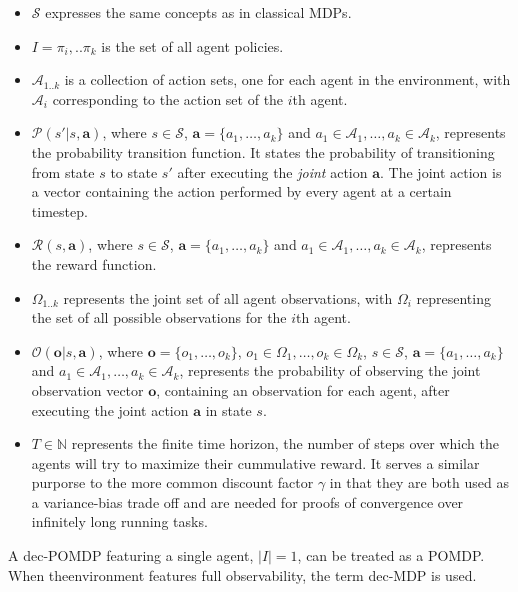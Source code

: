 \documentclass{../main.tex}{}
\begin{document}
    \begin{itemize}
        \item $\mathcal{S}$ expresses the same concepts as in classical MDPs.
        \item $I = {\pi_i,..\pi_k}$ is the set of all agent policies.
        \item $\mathcal{A}_{1..k}$ is a collection of action sets, one for each agent in the environment, with $\mathcal{A}_i$ corresponding to the action set of the $i$th agent.
        \item $\mathcal{P}(s' | s, \mathbf{a})$, where $s \in \mathcal{S}$, $\mathbf{a} = \{a_1,\ldots,a_k\}$ and $a_1 \in \mathcal{A}_1, \ldots, a_k \in \mathcal{A}_k$, represents the probability transition function. It states the probability of transitioning from state $s$ to state $s'$ after executing the \textit{joint} action $\mathbf{a}$. The joint action is a vector containing the action performed by every agent at a certain timestep.
        \item $\mathcal{R}(s, \mathbf{a})$, where $s \in \mathcal{S}$, $\mathbf{a} = \{a_1,\ldots,a_k\}$ and $a_1 \in \mathcal{A}_1, \ldots, a_k \in \mathcal{A}_k$, represents the reward function.
        \item $\Omega_{1..k}$ represents the joint set of all agent observations, with $\Omega_i$ representing the set of all possible observations for the $i$th agent.
        \item $\mathcal{O}(\mathbf{o} | s, \mathbf{a})$, where $\mathbf{o} = \{o_1,\ldots,o_k\}$, $o_1 \in \Omega_1, \ldots, o_k \in \Omega_k$, $s \in \mathcal{S}$, $\mathbf{a} = \{a_1,\ldots,a_k\}$ and $a_1 \in \mathcal{A}_1, \ldots, a_k \in \mathcal{A}_k$, represents the probability of observing the joint observation vector $\mathbf{o}$, containing an observation for each agent, after executing the joint action $\mathbf{a}$ in state $s$.
        \item $T \in \mathbb{N}$ represents the finite time horizon, the number of steps over which the agents will try to maximize their cummulative reward. It serves a similar purporse to the more common discount factor $\gamma$ in that they are both used as a variance-bias trade off and are needed for proofs of convergence over infinitely long running tasks.
    \end{itemize}

    A dec-POMDP featuring a single agent, $|I| = 1$, can be treated as a POMDP. When theenvironment features full observability, the term dec-MDP is used.
\end{document}
